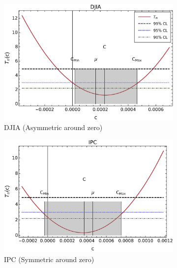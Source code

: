\documentclass{elsarticle}
\begin{document}
\begin{figure}[h!tb]
        \centering
        \begin{subfigure}[b]{0.45\textwidth}
            \centering
            \includegraphics[width=\textwidth]{figures/SymmetryPlots/simetria_TVReturns_DJIA.pdf}
            \caption[ ]%
            {{\small DJIA (Asymmetric around zero)}}
            \label{fig:TVRetsFigsDJIA}
        \end{subfigure}
        \quad
        \begin{subfigure}[b]{0.45\textwidth}
            \centering 
            \includegraphics[width=\textwidth]{figures/SymmetryPlots/simetria_TVReturns_IPC.pdf}
            \caption[ ]%
            {{\small IPC (Symmetric around zero)}}
            \label{fig:TVRetsFigsIPC}
        \end{subfigure}
        \begin{subfigure}[b]{0.45\textwidth}

\end{subfigure}
\end{figure}
\end{document}

